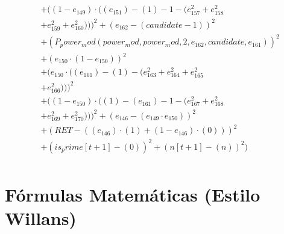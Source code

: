 \documentclass[10pt, a4paper]{article}
\begin{document}
\begin{small}
\begin{align*}
& + ((1 - e_{149})  \cdot  ((e_{151}) - (1) - 1 - (e_{157}^{2} + e_{158}^{2} \\
& + e_{159}^{2} + e_{160}^{2})))^{2} + (e_{162} - (candidate - 1))^{2} \\
& + (P_power_mod(power_mod, power_mod, 2, e_{162}, candidate, e_{161}))^{2} \\
& + (e_{150}  \cdot  (1 - e_{150}))^{2} \\
& + (e_{150}  \cdot  ((e_{161}) - (1) - (e_{163}^{2} + e_{164}^{2} + e_{165}^{2} \\
& + e_{166}^{2})))^{2} \\
& + ((1 - e_{150})  \cdot  ((1) - (e_{161}) - 1 - (e_{167}^{2} + e_{168}^{2} \\
& + e_{169}^{2} + e_{170}^{2})))^{2} + (e_{146} - (e_{149}  \cdot  e_{150}))^{2} \\
& + (RET - ((e_{146})  \cdot  (1) + (1 - e_{146})  \cdot  (0)))^{2} \\
& + (is_prime[t+1] - (0))^{2} + (n[t+1] - (n))^{2}) \\
\end{align*}
\end{small}\part{Fórmulas Matemáticas (Estilo Willans)}
\end{document}
